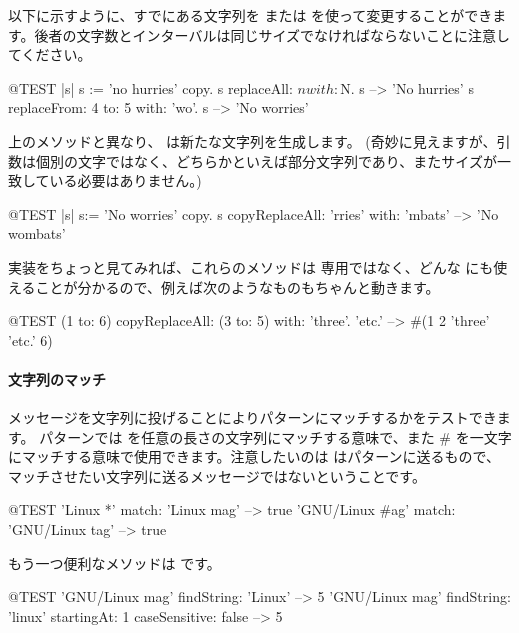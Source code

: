 \documentclass[a4paper,10pt,twoside]{book}
\begin{document}
以下に示すように、すでにある文字列を  または  を使って変更することができます。後者の文字数とインターバルは同じサイズでなければならないことに注意してください。

\begin{code}{@TEST |s| s := 'no hurries' copy.}
s replaceAll: $n with: $N.
s --> 'No hurries'
s replaceFrom: 4 to: 5 with: 'wo'.
s --> 'No worries'
\end{code}

上のメソッドと異なり、 は新たな文字列を生成します。
(奇妙に見えますが、引数は個別の文字ではなく、どちらかといえば部分文字列であり、またサイズが一致している必要はありません。)

\begin{code}{@TEST |s| s:= 'No worries' copy.}
s copyReplaceAll: 'rries' with: 'mbats' --> 'No wombats'
\end{code}

実装をちょっと見てみれば、これらのメソッドは  専用ではなく、どんな  にも使えることが分かるので、例えば次のようなものもちゃんと動きます。

\begin{code}{@TEST}
(1 to: 6) copyReplaceAll: (3 to: 5) with: { 'three'. 'etc.' } --> #(1 2 'three' 'etc.' 6)
\end{code}

\paragraph{文字列のマッチ}
 メッセージを文字列に投げることによりパターンにマッチするかをテストできます。
パターンでは \ct{*} を任意の長さの文字列にマッチする意味で、また \# を一文字にマッチする意味で使用できます。注意したいのは  はパターンに送るもので、マッチさせたい文字列に送るメッセージではないということです。
\begin{code}{@TEST}
'Linux *' match: 'Linux mag'                      --> true
'GNU/Linux #ag' match: 'GNU/Linux tag' --> true
\end{code}

もう一つ便利なメソッドは  です。
\begin{code}{@TEST}
'GNU/Linux mag' findString: 'Linux'                                                      --> 5
'GNU/Linux mag' findString: 'linux' startingAt: 1 caseSensitive: false  --> 5
\end{code}
\end{document}
